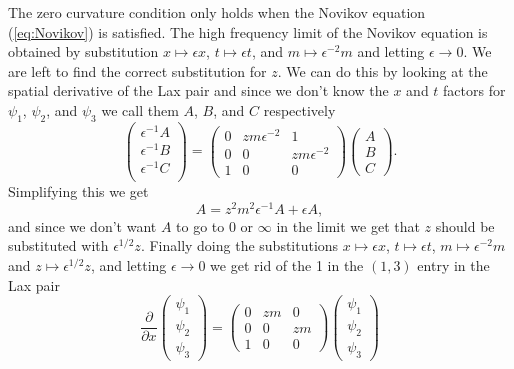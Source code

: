 \documentclass[english,master]{liumaiex}
\theoremstyle{plain}
\theoremstyle{definition}
\begin{document}
%
The zero curvature condition only holds when the Novikov equation (\ref{eq:Novikov}) is satisfied. The high frequency limit of the Novikov equation is obtained by substitution $x \mapsto \epsilon x$, $t \mapsto \epsilon t$, and $m \mapsto \epsilon^{-2} m$ and letting $\epsilon \rightarrow 0$. We are left to find the correct substitution for $z$. We can do this by looking at the spatial derivative of the Lax pair and since we don't know the $x$ and $t$ factors for $\psi_1$, $\psi_2$, and $\psi_3$ we call them $A$, $B$, and $C$ respectively
\begin{equation}
\begin{pmatrix} 
	\epsilon^{-1} A \\
	\epsilon^{-1} B \\
	\epsilon^{-1} C \\
\end{pmatrix} =
\begin{pmatrix}
	0 & zm\epsilon^{-2} & 1 \\
	0 & 0 & zm\epsilon^{-2}  \\
	1 & 0 & 0
\end{pmatrix}
\begin{pmatrix} A \\ B \\ C \end{pmatrix} .
\end{equation}
Simplifying this we get
\begin{equation}
	A = z^2m^2\epsilon^{-1}A + \epsilon A,
\end{equation}
and since we don't want $A$ to go to $0$ or $\infty$ in the limit we get that $z$ should be substituted with $\epsilon^{1/2}z$.
Finally doing the substitutions $x \mapsto \epsilon x$, $t \mapsto \epsilon t$, $m \mapsto \epsilon^{-2} m$ and $z \mapsto \epsilon^{1/2}z$, and letting $\epsilon \rightarrow 0$ we get rid of the 1 in the $(1,3)$ entry in the Lax pair
\begin{equation}
\frac{\partial}{\partial x}
\begin{pmatrix} \psi_1 \\ \psi_2 \\ \psi_3 \end{pmatrix} =
\begin{pmatrix}
	0 & zm & 0 \\
	0 & 0 & zm \\
	1 & 0 & 0
\end{pmatrix}
\begin{pmatrix} \psi_1 \\ \psi_2 \\ \psi_3 \end{pmatrix}
\end{equation}
\end{document}

